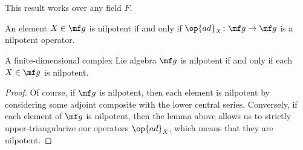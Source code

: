 \documentclass[../notes.tex]{subfiles}
\begin{document}
\begin{remark}
	This result works over any field $F$.
\end{remark}
\begin{definition}
	An element $X\in\mf g$ is nilpotent if and only if $\op{ad}_X\colon\mf g\to\mf g$ is a nilpotent operator.
\end{definition}
\begin{corollary}
	A finite-dimensional complex Lie algebra $\mf g$ is nilpotent if and only if each $X\in\mf g$ is nilpotent.
\end{corollary}
\begin{proof}
	Of course, if $\mf g$ is nilpotent, then each element is nilpotent by considering some adjoint composite with the lower central series. Conversely, if each element of $\mf g$ is nilpotent, then the lemma above allows us to strictly upper-triangularize our operators $\op{ad}_X$, which means that they are nilpotent.
\end{proof}
\end{document}

